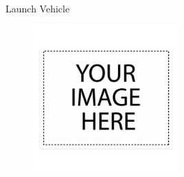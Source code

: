 \documentclass[10pt]{beamer}
\begin{document}
	\begin{frame}{Launch Vehicle}
\begin{figure}
	\centering
	\includegraphics[width=0.5\textwidth]{Launch_Vehicle.png}
\end{figure}
\end{frame}
\end{document}
